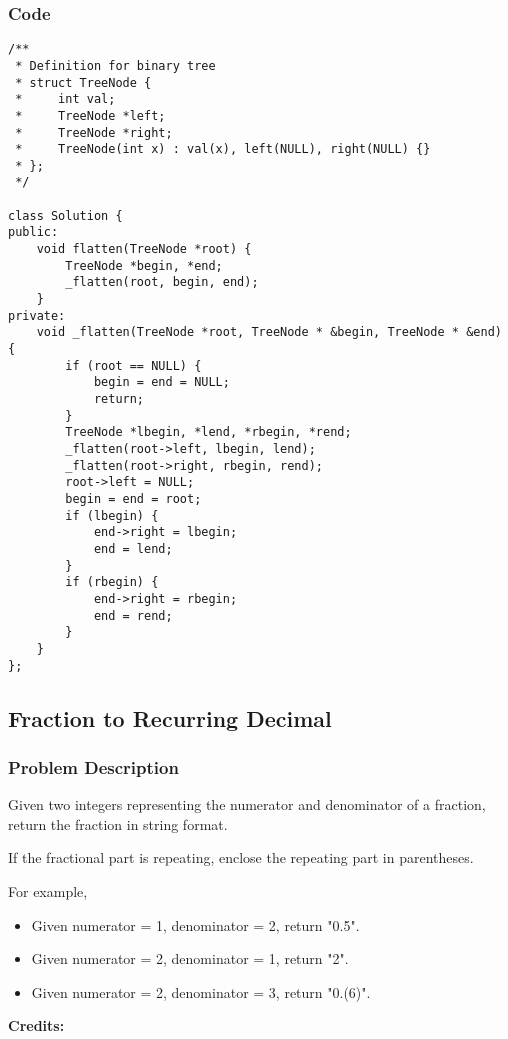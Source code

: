 \documentclass{article}
\begin{document}
\begin{CJK*}{UTF8}{gkai}
\subsubsection*{Code}
\begin{lstlisting}
/**
 * Definition for binary tree
 * struct TreeNode {
 *     int val;
 *     TreeNode *left;
 *     TreeNode *right;
 *     TreeNode(int x) : val(x), left(NULL), right(NULL) {}
 * };
 */

class Solution {
public:
    void flatten(TreeNode *root) {
        TreeNode *begin, *end;
        _flatten(root, begin, end);
    }
private:
    void _flatten(TreeNode *root, TreeNode * &begin, TreeNode * &end) {
        if (root == NULL) {
            begin = end = NULL;
            return;
        }
        TreeNode *lbegin, *lend, *rbegin, *rend;
        _flatten(root->left, lbegin, lend);
        _flatten(root->right, rbegin, rend);
        root->left = NULL;
        begin = end = root;
        if (lbegin) {
            end->right = lbegin;
            end = lend;
        }
        if (rbegin) {
            end->right = rbegin;
            end = rend;
        }
    }
};

\end{lstlisting}


\subsection{ Fraction to Recurring Decimal }
\label{ Fraction to Recurring Decimal }

\subsubsection*{Problem Description}
Given two integers representing the numerator and denominator of a fraction, return the fraction in string format.

If the fractional part is repeating, enclose the repeating part in parentheses.

For example,

\begin{itemize}
\item Given numerator = 1, denominator = 2, return "0.5".
\item Given numerator = 2, denominator = 1, return "2".
\item Given numerator = 2, denominator = 3, return "0.(6)".
\end{itemize}

\textbf{Credits:}


\end{CJK*}
\end{document}
